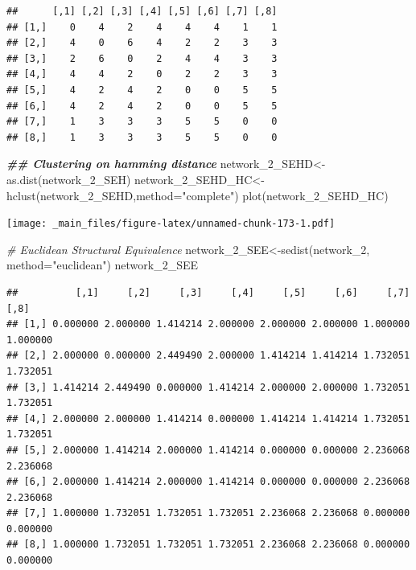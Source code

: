 \documentclass[
  notitlepage,
  onecolumn,
  openany]{book}
\newenvironment{Shaded}{\begin{snugshade}}{\end{snugshade}}
\newcommand{\AttributeTok}[1]{\textcolor[rgb]{0.77,0.63,0.00}{#1}}
\newcommand{\CommentTok}[1]{\textcolor[rgb]{0.56,0.35,0.01}{\textit{#1}}}
\newcommand{\DocumentationTok}[1]{\textcolor[rgb]{0.56,0.35,0.01}{\textbf{\textit{#1}}}}
\newcommand{\FunctionTok}[1]{\textcolor[rgb]{0.00,0.00,0.00}{#1}}
\newcommand{\NormalTok}[1]{#1}
\newcommand{\OtherTok}[1]{\textcolor[rgb]{0.56,0.35,0.01}{#1}}
\newcommand{\StringTok}[1]{\textcolor[rgb]{0.31,0.60,0.02}{#1}}
\begin{document}
\begin{verbatim}
##      [,1] [,2] [,3] [,4] [,5] [,6] [,7] [,8]
## [1,]    0    4    2    4    4    4    1    1
## [2,]    4    0    6    4    2    2    3    3
## [3,]    2    6    0    2    4    4    3    3
## [4,]    4    4    2    0    2    2    3    3
## [5,]    4    2    4    2    0    0    5    5
## [6,]    4    2    4    2    0    0    5    5
## [7,]    1    3    3    3    5    5    0    0
## [8,]    1    3    3    3    5    5    0    0
\end{verbatim}

\begin{Shaded}
\begin{Highlighting}[]
\DocumentationTok{\#\# Clustering on hamming distance}
\NormalTok{network\_2\_SEHD}\OtherTok{\textless{}{-}}\FunctionTok{as.dist}\NormalTok{(network\_2\_SEH)}
\NormalTok{network\_2\_SEHD\_HC}\OtherTok{\textless{}{-}}\FunctionTok{hclust}\NormalTok{(network\_2\_SEHD,}\AttributeTok{method=}\StringTok{"complete"}\NormalTok{)}
\FunctionTok{plot}\NormalTok{(network\_2\_SEHD\_HC)}
\end{Highlighting}
\end{Shaded}

\texttt{[image: \_main\_files/figure-latex/unnamed-chunk-173-1.pdf]}

\begin{Shaded}
\begin{Highlighting}[]
\CommentTok{\# Euclidean Structural Equivalence}
\NormalTok{network\_2\_SEE}\OtherTok{\textless{}{-}}\FunctionTok{sedist}\NormalTok{(network\_2, }\AttributeTok{method=}\StringTok{"euclidean"}\NormalTok{)}
\NormalTok{network\_2\_SEE}
\end{Highlighting}
\end{Shaded}

\begin{verbatim}
##          [,1]     [,2]     [,3]     [,4]     [,5]     [,6]     [,7]     [,8]
## [1,] 0.000000 2.000000 1.414214 2.000000 2.000000 2.000000 1.000000 1.000000
## [2,] 2.000000 0.000000 2.449490 2.000000 1.414214 1.414214 1.732051 1.732051
## [3,] 1.414214 2.449490 0.000000 1.414214 2.000000 2.000000 1.732051 1.732051
## [4,] 2.000000 2.000000 1.414214 0.000000 1.414214 1.414214 1.732051 1.732051
## [5,] 2.000000 1.414214 2.000000 1.414214 0.000000 0.000000 2.236068 2.236068
## [6,] 2.000000 1.414214 2.000000 1.414214 0.000000 0.000000 2.236068 2.236068
## [7,] 1.000000 1.732051 1.732051 1.732051 2.236068 2.236068 0.000000 0.000000
## [8,] 1.000000 1.732051 1.732051 1.732051 2.236068 2.236068 0.000000 0.000000
\end{verbatim}
\end{document}
